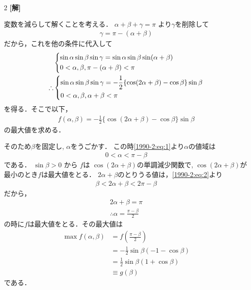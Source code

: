 \documentclass[../../../../main.tex]{subfiles}
\begin{document}
\setcounter{equation}{0}
\begin{oframed}
  
\end{oframed}
\setlength{\columnseprule}{0.4pt}
\begin{multicols}{2}
  {\bf[解]}

  変数を減らして解くことを考える．
  $\alpha + \beta + \gamma = \pi$ より$\gamma$を削除して
  \begin{align*}
    \gamma = \pi - (\alpha + \beta)
  \end{align*}
  だから，これを他の条件に代入して
  \begin{align}
     & \begin{dcases}
         \sin\alpha\sin\beta\sin\gamma = \sin\alpha\sin\beta\sin(\alpha+\beta) \\
         0 < \alpha, \beta, \pi - (\alpha + \beta) < \pi
       \end{dcases}                  \\
    \therefore
     & \begin{dcases}
         \sin\alpha\sin\beta\sin\gamma = -\frac{1}{2}\{\cos(2\alpha+\beta)-\cos\beta\}\sin\beta \\
         0 < \alpha, \beta, \alpha+\beta < \pi
       \end{dcases} \label{1990-2:eq:1}
  \end{align}
  を得る．そこで以下，
  \begin{align*}
    f(\alpha,\beta) =  -\frac{1}{2}\{\cos(2\alpha+\beta)-\cos\beta\}\sin\beta
  \end{align*}
  の最大値を求める．

  そのため$\beta$を固定し, $\alpha$をうごかす．
  この時\cref{1990-2:eq:1}より$\alpha$の値域は
  \begin{align}
    0 < \alpha < \pi-\beta \label{1990-2:eq:2}
  \end{align}
  である．
  $\sin\beta > 0$ から $f$は $\cos(2\alpha+\beta)$の単調減少関数で,
  $\cos(2\alpha+\beta)$が最小のとき$f$は最大値をとる．
  $2\alpha+\beta$のとりうる値は，\cref{1990-2:eq:2}より
  \begin{align*}
    \beta < 2\alpha+\beta < 2\pi-\beta
  \end{align*}
  だから，
  \begin{align*}
    2\alpha+\beta = \pi \\
    \therefore
    \alpha = \frac{\pi-\beta}{2}
  \end{align*}
  の時に$f$は最大値をとる．その最大値は
  \begin{align}
    \max f(\alpha,\beta)
     & = f\left(\frac{\pi-\beta}{2}\right)   \\
     & = -\frac{1}{2}\sin\beta(-1-\cos\beta) \\
     & = \frac{1}{2}\sin\beta(1+\cos\beta)   \\
     & \equiv g(\beta)
  \end{align}
  である．


\end{multicols}
\end{document}
